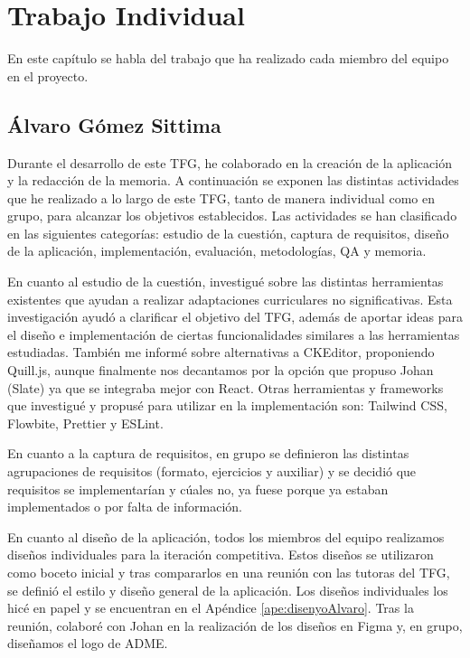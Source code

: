 \chapter{Trabajo Individual}
\label{cap:TrabajoIndividual}

En este capítulo se habla del trabajo que ha realizado cada miembro del equipo en el proyecto.

\section{Álvaro Gómez Sittima}
Durante el desarrollo de este TFG, he colaborado en la creación de la aplicación y la redacción de la memoria. A continuación se exponen las distintas actividades que he realizado a lo largo de este TFG, tanto de manera individual como en grupo, para alcanzar los objetivos establecidos. Las actividades se han clasificado en las siguientes categorías: estudio de la cuestión, captura de requisitos, diseño de la aplicación, implementación, evaluación, metodologías, QA y memoria.

En cuanto al estudio de la cuestión, investigué sobre las distintas herramientas existentes que ayudan a realizar adaptaciones curriculares no significativas. Esta investigación ayudó a clarificar el objetivo del TFG, además de aportar ideas para el diseño e implementación de ciertas funcionalidades similares a las herramientas estudiadas. También me informé sobre alternativas a CKEditor, proponiendo Quill.js, aunque finalmente nos decantamos por la opción que propuso Johan (Slate) ya que se integraba mejor con React. Otras herramientas y frameworks que investigué y propusé para utilizar en la implementación son: Tailwind CSS, Flowbite, Prettier y ESLint.

En cuanto a la captura de requisitos, en grupo se definieron las distintas agrupaciones de requisitos (formato, ejercicios y auxiliar) y se decidió que requisitos se implementarían y cúales no, ya fuese porque ya estaban implementados o por falta de información.

En cuanto al diseño de la aplicación, todos los miembros del equipo realizamos diseños individuales para la iteración competitiva. Estos diseños se utilizaron como boceto inicial y tras compararlos en una reunión con las tutoras del TFG, se definió el estilo y diseño general de la aplicación. Los diseños individuales los hicé en papel y se encuentran en el Apéndice \ref{ape:disenyoAlvaro}. Tras la reunión, colaboré con Johan en la realización de los diseños en Figma y, en grupo, diseñamos el logo de ADME.

